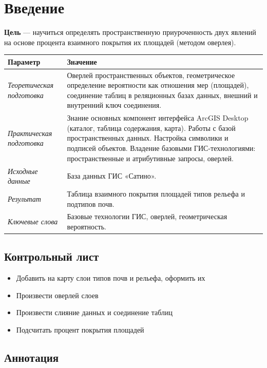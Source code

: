 \documentclass[]{book}
\providecommand{\tightlist}{%
  \setlength{\itemsep}{0pt}\setlength{\parskip}{0pt}}
\theoremstyle{definition}
\theoremstyle{definition}
\theoremstyle{definition}
\theoremstyle{remark}
\begin{document}
\hypertarget{overlay-intro}{%
\section{Введение}\label{overlay-intro}}

\textbf{Цель} --- научиться определять пространственную приуроченность
двух явлений на основе процента взаимного покрытия их площадей (методом
оверлея).

\begin{longtable}[]{@{}ll@{}}
\toprule
Параметр & Значение\tabularnewline
\midrule
\endhead
\emph{Теоретическая подготовка} & Оверлей пространственных объектов,
геометрическое определение вероятности как отношения мер (площадей),
соединение таблиц в реляционных базах данных, внешний и внутренний ключ
соединения.\tabularnewline
\emph{Практическая подготовка} & Знание основных компонент интерфейса
ArcGIS Desktop (каталог, таблица содержания, карта). Работы с базой
пространственных данных. Настройка символики и подписей объектов.
Владение базовыми ГИС-технологиями: пространственные и атрибутивные
запросы, оверлей.\tabularnewline
\emph{Исходные данные} & База данных ГИС «Сатино».\tabularnewline
\emph{Результат} & Таблица взаимного покрытия площадей типов рельефа и
подтипов почв.\tabularnewline
\emph{Ключевые слова} & Базовые технологии ГИС, оверлей, геометрическая
вероятность.\tabularnewline
\bottomrule
\end{longtable}

\hypertarget{overlay-control}{%
\subsection{Контрольный лист}\label{overlay-control}}

\begin{itemize}
\tightlist
\item
  Добавить на карту слои типов почв и рельефа, оформить их
\item
  Произвести оверлей слоев
\item
  Произвести слияние данных и соединение таблиц
\item
  Подсчитать процент покрытия площадей
\end{itemize}

\hypertarget{overlay-annotation}{%
\subsection{Аннотация}\label{overlay-annotation}}
\end{document}
